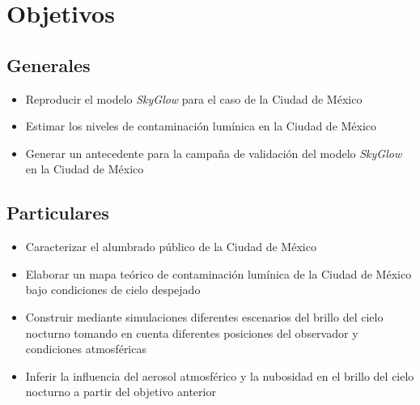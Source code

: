 \section{Objetivos}

\subsection{Generales}

\begin{itemize}

    \item Reproducir el modelo \textit{SkyGlow} para el caso de la Ciudad de México
    
    \item Estimar los niveles de contaminación lumínica en la Ciudad de México 
    
    \item Generar un antecedente para la campaña de validación del modelo \textit{SkyGlow} en la Ciudad de México
    
\end{itemize}

\subsection{Particulares}

\begin{itemize}

    \item Caracterizar el alumbrado público de la Ciudad de México 
    
    \item Elaborar un mapa teórico de contaminación lumínica de la Ciudad de México bajo condiciones de cielo despejado
    
    \item Construir mediante simulaciones diferentes escenarios del brillo del cielo nocturno tomando en cuenta diferentes posiciones del observador y condiciones atmosféricas
    
    \item Inferir la influencia del aerosol atmosférico  y la nubosidad en el brillo del cielo nocturno a partir del objetivo anterior
    
    
\end{itemize}